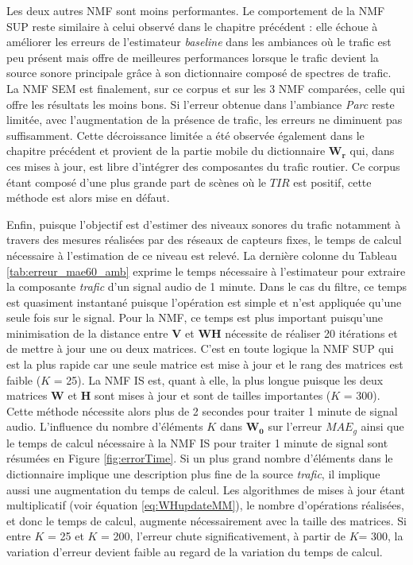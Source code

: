 Les deux autres NMF sont moins performantes.
Le comportement de la NMF SUP reste similaire à celui observé dans le chapitre précédent : elle échoue à améliorer les erreurs de l'estimateur \textit{baseline} dans les ambiances où le trafic est peu présent mais offre de meilleures performances lorsque le trafic devient la source sonore principale grâce à son dictionnaire composé de spectres de trafic.
La NMF SEM est finalement, sur ce corpus et sur les 3 NMF comparées, celle qui offre les résultats les moins bons. Si l'erreur obtenue dans l'ambiance \textit{Parc} reste limitée, avec l'augmentation de la présence de trafic, les erreurs ne diminuent pas suffisamment. Cette décroissance limitée a été observée également dans le chapitre précédent et provient de la partie mobile du dictionnaire $\mathbf{W_r}$ qui, dans ces mises à jour, est libre d'intégrer des composantes du trafic routier. Ce corpus étant composé d'une plus grande part de scènes où le $TIR$ est positif, cette méthode est alors mise en défaut. 

Enfin, puisque l'objectif est d'estimer des niveaux sonores du trafic notamment à travers des mesures réalisées par des réseaux de capteurs fixes, le temps de calcul nécessaire à l'estimation de ce niveau est relevé. La dernière colonne du Tableau \ref{tab:erreur_mae60_amb} exprime le temps nécessaire à l'estimateur pour extraire la composante \textit{trafic} d'un signal audio de 1 minute. Dans le cas du filtre, ce temps est quasiment instantané puisque l'opération est simple et n'est appliquée qu'une seule fois sur le signal.
Pour la NMF, ce temps est plus important puisqu'une minimisation de la distance entre $\mathbf{V}$ et $\mathbf{WH}$ nécessite de réaliser 20  itérations et de mettre à jour une ou deux matrices. C'est en toute logique la NMF SUP qui est la plus rapide car une seule matrice est mise à jour et le rang des matrices est faible ($K$ = 25).
La NMF IS est, quant à elle, la plus longue puisque les deux matrices $\mathbf{W}$ et $\mathbf{H}$ sont mises à jour et sont de tailles importantes ($K$ = 300). Cette méthode nécessite alors plus de 2 secondes pour traiter 1 minute de signal audio. L'influence du nombre d'éléments $K$ dans $\mathbf{W_0}$ sur l'erreur $MAE_g$ ainsi que le temps de calcul nécessaire à la NMF IS pour traiter 1 minute de signal sont résumées en Figure \ref{fig:errorTime}. Si un plus grand nombre d'éléments dans le dictionnaire implique une description plus fine de la source \textit{trafic}, il implique aussi une augmentation du temps de calcul. Les algorithmes de mises à jour étant multiplicatif (voir équation \ref{eq:WHupdateMM}), le nombre d'opérations réalisées, et donc le temps de calcul, augmente nécessairement avec la taille des matrices. Si entre $K$ = 25 et $K$ = 200, l'erreur chute significativement, à partir de $K$= 300, la variation d'erreur devient faible au regard de la variation du temps de calcul. 

